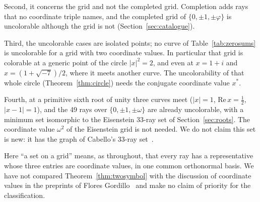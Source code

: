Second, it concerns the grid and not the completed grid.  Completion adds rays that no
coordinate triple names, and the completed grid of $\{0,\pm1,\pm\varphi\}$ is uncolorable although the grid
is not
(Section~\ref{sec:catalogue}).

Third, the uncolorable cases are isolated points; no curve of Table~\ref{tab:zerosums} is
uncolorable for a grid with two coordinate values.  In particular that grid is colorable at a
generic point of the circle $|x|^2=2$, and even at $x=1+i$ and $x=(1+\sqrt{-7})/2$, where it
meets another curve.  The uncolorability of that whole circle (Theorem~\ref{thm:circle}) needs the
conjugate coordinate value $x^{*}$.

Fourth, at a primitive sixth root of unity three curves
meet ($|x|=1$, $\mathrm{Re}\,x=\tfrac12$, $|x-1|=1$), and the 49 rays over $\{0,\pm1,\pm\omega\}$
are already uncolorable, with a minimum set isomorphic to the Eisenstein 33-ray set of
Section~\ref{sec:roots}.  The coordinate value $\omega^2$ of the Eisenstein grid is not needed.  We do
not claim this set is new: it has the graph of Cabello's 33-ray set~\cite{Cabello2025simplest}.

Here ``a set on a grid'' means, as throughout, that every ray has a representative
whose three entries are coordinate values, in one common orthonormal basis.  We have not compared
Theorem~\ref{thm:twosymbol} with the discussion of coordinate values in the preprints of Flores
Gordillo~\cite{FloresGordillo2026} and make no claim of priority for the classification.
